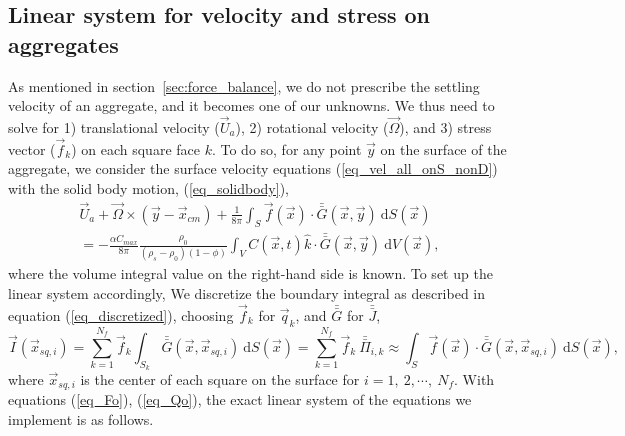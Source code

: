  \subsection{Linear system for velocity and stress on aggregates}
As mentioned in section~\ref{sec:force_balance}, we do not prescribe the settling velocity of an aggregate, and it becomes one of our unknowns.
We thus need to solve for 1) translational velocity ($\vec{U}_a$), 2) rotational velocity ($\vec{\Omega}$), and 3) stress vector ($\vec{f}_k$) on each square face $k$.
To do so, for any point $\vec{y}$ on the surface of the aggregate, we consider the surface velocity equations (\ref{eq_vel_all_onS_nonD}) with the solid body motion, (\ref{eq_solidbody}), 
 \begin{align}
	\vec{U}_a + \vec{\Omega} \times (\vec{y} - \vec{x}_{cm})
+ \frac{1}{8 \pi} \int_{S}  
		  \vec{f}(\vec{x}) 
		  \cdot \bar{\bar{G  }} (\vec{x},\vec{y}) 
		  \ \textrm{d}S(\vec{x})
		  \nonumber \\
=  -\frac{ \alpha C_{max}}{8\pi } \frac{\rho_0}{(\rho_s - \rho_0)(1-\phi)} 
\int_{V} C\left(\vec{x},  t \right) \hat{k} \cdot 
\bar{\bar{G}}(\vec{x}, \vec{y} ) 
\ \text{d}V(\vec{x}),
 \label{eq_slp_lin_eq}
 \end{align}
where the volume integral value on the right-hand side is known. 
To set up the linear system accordingly, We discretize the boundary integral as described in equation (\ref{eq_discretized}), choosing $\vec{f}_k$ for $\vec{q}_k$, and $ \bar{\bar{G}}$ for $\bar{\bar{J}}$, 
\begin{equation}
	\vec{I}(\vec{x}_{sq,i})  =   \sum_{k=1}^{N_f}  \vec{f}_k   \int_{S_{k}} \bar{\bar{G}}(\vec{x},\vec{x}_{sq,i}) \ \text{d}S(\vec{x}) 
	= \sum_{k=1}^{N_f} \vec{f}_k   \ \bar{\bar{\Pi}}_{i,k}
	\approx \int_{S}  
	\vec{f}(\vec{x}) 
	\cdot \bar{\bar{G  }} (\vec{x},\vec{x}_{sq,i}) 
	\ \textrm{d}S(\vec{x}),
\end{equation}
where $\vec{x}_{sq, i}$ is the center of each square on the surface for $i = 1, \  2, \cdots, \  N_f$.
With equations (\ref{eq_Fo}), (\ref{eq_Qo}), the exact linear system of the equations we implement is as follows.
